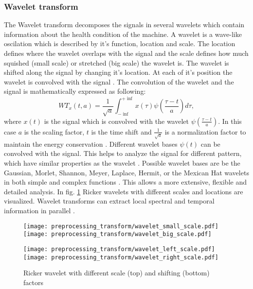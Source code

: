 \subsubsection{Wavelet transform}
The Wavelet transform decomposes the signals in several wavelets which contain information about the health condition of the machine. A wavelet is a wave-like oscilation which is described by it's function, location and scale. The location defines where the wavelet overlaps with the signal and the scale defines how much squished (small scale) or stretched (big scale) the wavelet is. The wavelet is shifted along the signal by changing it's location. At each of it's position the wavelet is convolved with the signal \cite{Shawhin2020}. The convolution of the wavelet and the signal is mathematically expressed as following:
\begin{equation}
    WT_{x}(t,a) = \frac{1}{\sqrt{a}} \int_{- \inf}^{+ \inf} x(\tau) \psi(\frac{\tau -t}{a}) d \tau,
\end{equation}
 where $x(t)$ is the signal which is convolved with the wavelet $\psi(\frac{\tau -t}{a})$. In this case $a$ is the scaling factor, $t$ is the time shift and $\frac{1}{\sqrt{a}}$ is a normalization factor to maintain the energy conservation \cite{FENG2013}. Different wavelet bases $\psi(t)$ can be convolved with the signal. This helps to analyze the signal for different pattern, which have similar properties as the wavelet \cite{Shawhin2020}. Possible wavelet bases are be the Gaussian, Morlet, Shannon, Meyer, Laplace, Hermit, or the Mexican Hat wavelets in both simple and complex functions \cite{Verstraete2017}. This allows a more extensive, flexible and detailed analysis. In fig. \ref{fig:ricker_wavelet} Ricker wavelets with different scales and locations are visualized. Wavelet transforms can extract local spectral and temporal information in parallel \cite{Shawhin2020}.


\begin{figure}[H]
  \centering
  \texttt{[image: preprocessing\_transform/wavelet\_small\_scale.pdf]}
  \hspace{.1cm}
  \texttt{[image: preprocessing\_transform/wavelet\_big\_scale.pdf]}
  
  \vspace{.1cm}
  
  \texttt{[image: preprocessing\_transform/wavelet\_left\_scale.pdf]}
  \hspace{.1cm}
  \texttt{[image: preprocessing\_transform/wavelet\_right\_scale.pdf]}

  \caption{Ricker wavelet with different scale (top) and shifting (bottom) factors}
  \label{fig:ricker_wavelet}
\end{figure}

